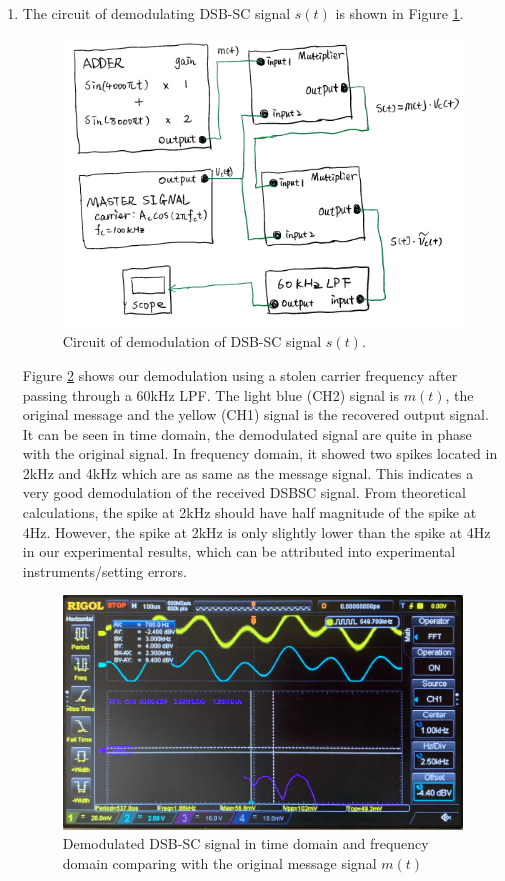\documentclass[11pt]{article}
\begin{document}
\begin{enumerate}[label=(\alph*)]
\item %
The circuit of demodulating DSB-SC signal $s(t)$ is shown in Figure \ref{fig:3ccircuit}.
\begin{figure}[H]
    \centering
    \includegraphics[scale=0.9]{3ccircuit.PNG}
    \caption{\label{fig:3ccircuit}Circuit of demodulation of DSB-SC signal $s(t)$.}
\end{figure}

Figure \ref{fig:q3c} shows our demodulation using a stolen carrier frequency after passing through a 60kHz LPF. The light blue (CH2) signal is $m(t)$, the original message and the yellow (CH1) signal is the recovered output signal. It can be seen in time domain, the demodulated signal are quite in phase with the original signal. In frequency domain, it showed two spikes located in 2kHz and 4kHz which are as same as the message signal. This indicates a very good demodulation of the received DSBSC signal. From theoretical calculations, the spike at 2kHz should have half magnitude of the spike at 4Hz. However, the spike at 2kHz is only slightly lower than the spike at 4Hz in our experimental results, which can be attributed into experimental instruments/setting errors. 
\begin{figure}[H]
    \centering
    \includegraphics[scale = 0.135]{Q3c.jpg}
    \caption{\label{fig:q3c}Demodulated DSB-SC signal in time domain and frequency domain comparing with the original message signal $m(t)$}
\end{figure}


\end{enumerate}
\end{document}
